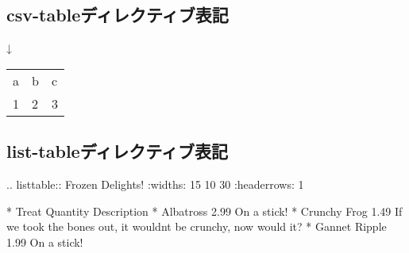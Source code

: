 \documentclass[letterpaper,10pt,dvipdfmx,openany,oneside]{sphinxmanual}
\begin{document}
\subsection{csv-tableディレクティブ表記}
\label{\detokenize{source/1.chapter/basic_syntax:csv-table}}
%
\begin{sphinxVerbatim}[commandchars=\\\{\}]
 
      
    

\end{sphinxVerbatim}

↓


\begin{savenotes}\sphinxattablestart
\raggedright
\begin{tabulary}{\linewidth}[t]{|T|T|T|}
\hline
{}\relax &\relax &\relax \\
\hline
a
&
b
&
c
\\
&
2
&
3
\\
\hline
\end{tabulary}
\par
\sphinxattableend\end{savenotes}


\subsection{list-tableディレクティブ表記}
\label{\detokenize{source/1.chapter/basic_syntax:list-table}}
%
\begin{sphinxVerbatim}[commandchars=\\\{\}]
.. list\PYGZhy{}table:: Frozen Delights!
   :widths: 15 10 30
   :header\PYGZhy{}rows: 1

   * \PYGZhy{} Treat
   \PYGZhy{} Quantity
   \PYGZhy{} Description
   * \PYGZhy{} Albatross
   \PYGZhy{} 2.99
   \PYGZhy{} On a stick!
   * \PYGZhy{} Crunchy Frog
   \PYGZhy{} 1.49
   \PYGZhy{} If we took the bones out, it wouldn\PYGZsq{}t be
      crunchy, now would it?
   * \PYGZhy{} Gannet Ripple
   \PYGZhy{} 1.99
   \PYGZhy{} On a stick!
\end{sphinxVerbatim}
\end{document}
